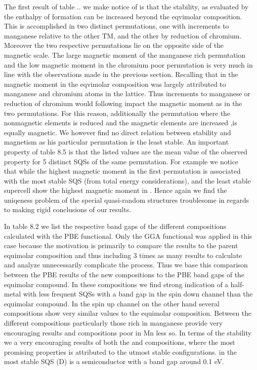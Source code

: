 The first result of table .. we make notice of is that the stability, as evaluated by the enthalpy of formation can be increased beyond the eqvimolar composition. This is accomplished in two distinct permutations, one with increments to  manganese relative to the other TM, and the other by reduction of chromium. Moreover the two respective permutations lie on the opposite side of the magnetic scale. The large magnetic moment of the manganese rich permutation and the low magnetic moment in the chromium poor permutation is very much in line with the observations made in the previous section. Recalling that in the magnetic moment in the eqvimolar composition was largely attributed to manganese and chromium atoms in the lattice. Thus increments to manganese or reduction of chromium would following impact the magnetic moment as in the two permutations. For this reason, additionally the permutation  where the nonmagnetic elements is reduced and the magnetic elements are increased ,is equally magnetic. We however find no direct relation between stability and magnetism as his particular permutation is the least stable. An important property of table 8.5 is that the listed values are the mean value of the observed property for 5 distinct SQSs of the same permutation. For example we notice that while the highest magnetic moment in the first permutation is associated with the most stable SQS (from total energy considerations), and the least stable supercell show the highest magnetic moment in . Hence again we find the uniqeness problem of the special quasi-random structures troublesome in regards to making rigid conclusions of our results.  

In table 8.2 we list the respective band gaps of the different compositions calculated with the PBE functional. Only the GGA functional was applied in this case because the motivation is primarily to compare the results to the parent equimolar composition and thus including 3 times as many results to calculate and analyze unnecessarily complicate the process. Thus we base this comparison between the PBE results of the new compositions to the PBE band gaps of the equimolar compound. In these compositions we find strong indication of a half-metal with less frequent SQSs with a band gap in the spin down channel than the equimolar compound. In the spin up channel on the other hand several compositions show very similar values to the equimolar composition. Between the different compositions particularly those rich in manganese provide very encouraging results and compositions poor in Mn less so. In terms of the stability we a very encouraging results of both the  and  compositions, where the most promising properties is attributed to the utmost stable configurations.  in  the most stable SQS (D) is a semiconductor with a band gap around 0.1 eV.

